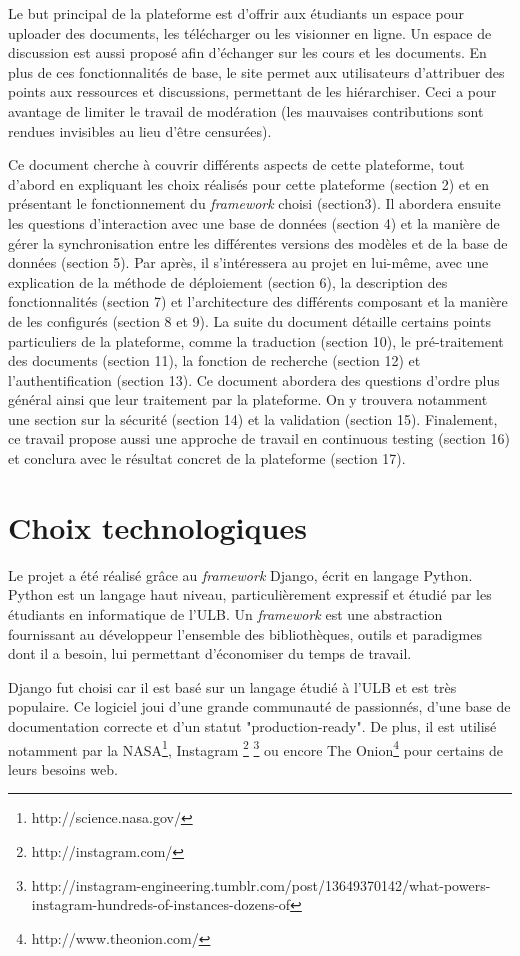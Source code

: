 \documentclass[a4paper,12pt]{article}
\begin{document}
Le but principal de la plateforme est d'offrir aux étudiants un espace pour uploader
des documents, les télécharger ou les visionner en ligne. Un espace de discussion est aussi proposé
afin d'échanger sur les cours et les documents. En plus de ces fonctionnalités de base,
le site permet aux utilisateurs d'attribuer des points aux ressources et discussions,
permettant de les hiérarchiser. Ceci a pour avantage de limiter le travail de modération (les mauvaises
contributions sont rendues invisibles au lieu d'être censurées).

Ce document cherche à couvrir différents aspects de cette plateforme, tout d'abord en
expliquant les choix réalisés pour cette plateforme (section 2) et en présentant
le fonctionnement du \textit{framework} choisi (section3). Il abordera ensuite
les questions d'interaction avec une base de données (section 4) et la manière
de gérer la synchronisation entre les différentes versions des modèles et de
la base de données (section 5). Par après, il s'intéressera au projet en lui-même,
avec une explication de la méthode de déploiement (section 6), la
description des fonctionnalités (section 7) et l'architecture des différents
composant et la manière de les configurés (section 8 et 9). La suite du
document détaille certains points particuliers de la plateforme, comme la traduction (section 10),
le pré-traitement des documents (section 11), la fonction de recherche (section 12)
et l'authentification (section 13). Ce document abordera des questions d'ordre 
plus général ainsi que leur traitement par la plateforme. On y trouvera notamment une section sur la
sécurité (section 14) et la validation (section 15). Finalement, ce travail propose aussi
une approche de travail en continuous testing (section 16) et conclura
avec le résultat concret de la plateforme (section 17).


\section{Choix technologiques}

Le projet a été réalisé grâce au \textit{framework} Django, écrit en langage Python.
Python est un langage haut niveau, particulièrement expressif et étudié par
les étudiants en informatique de l'ULB. Un \textit{framework} est une abstraction
fournissant au développeur l'ensemble des bibliothèques, outils et paradigmes
dont il a besoin, lui permettant d'économiser du temps de travail. 

Django fut choisi car il est basé sur un langage étudié à l'ULB et est très populaire.
Ce logiciel joui d'une grande communauté de passionnés, d'une base de documentation
correcte et d'un statut "production-ready". De plus, il est utilisé notamment
par la NASA\footnote{http://science.nasa.gov/}, Instagram
\footnote{http://instagram.com/}
\footnote{http://instagram-engineering.tumblr.com/post/13649370142/what-powers-instagram-hundreds-of-instances-dozens-of}
ou encore The Onion\footnote{http://www.theonion.com/} pour certains de leurs besoins web.
\end{document}

